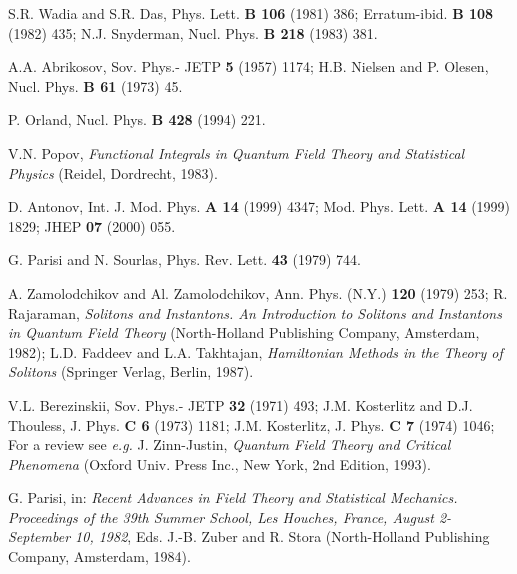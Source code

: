 \documentclass[a4paper,12pt]{article}
\begin{document}
\begin{thebibliography}{99}
S.R. Wadia and S.R. Das, Phys. Lett. {\bf B 106} (1981) 386; 
Erratum-ibid. {\bf B 108} (1982) 435;
N.J. Snyderman, Nucl. Phys. {\bf B 218} (1983) 381.


A.A. Abrikosov, Sov. Phys.- JETP {\bf 5} (1957) 1174;
H.B. Nielsen and P. Olesen, Nucl. Phys. {\bf B 61} (1973) 45.

P. Orland, Nucl. Phys. {\bf B 428} (1994) 221.

V.N. Popov, {\it Functional Integrals in Quantum Field Theory and Statistical Physics} (Reidel, Dordrecht, 1983).

D. Antonov, Int. J. Mod. Phys. {\bf A 14} (1999) 4347; Mod. Phys. Lett. {\bf A 14} (1999) 1829; 
JHEP {\bf 07} (2000) 055.

G. Parisi and N. Sourlas, Phys. Rev. Lett. {\bf 43} (1979) 744.

A. Zamolodchikov and Al. Zamolodchikov, Ann. Phys. (N.Y.) {\bf 120} (1979) 253; 
R. Rajaraman, {\it Solitons and Instantons. An Introduction to Solitons and Instantons in Quantum Field Theory} 
(North-Holland Publishing Company, Amsterdam, 1982); 
L.D. Faddeev and L.A. Takhtajan, {\it Hamiltonian Methods in the Theory of Solitons} (Springer Verlag, Berlin, 1987).

V.L. Berezinskii, Sov. Phys.- JETP {\bf 32} (1971) 493; 
J.M. Kosterlitz and D.J. Thouless, J. Phys. {\bf C 6} (1973) 1181; J.M. Kosterlitz, J. Phys. {\bf C 7} (1974) 1046; 
For a review see {\it e.g.} J. Zinn-Justin, {\it Quantum Field Theory and Critical Phenomena} (Oxford Univ. Press Inc., 
New York, 2nd Edition, 1993).

G. Parisi, in: {\it Recent Advances in Field Theory and Statistical Mechanics. Proceedings of the 39th Summer School, Les Houches, France, August 2- 
September 10, 1982}, Eds. J.-B. Zuber and R. Stora (North-Holland Publishing Company, Amsterdam, 1984).



\end{thebibliography}
\end{document}

